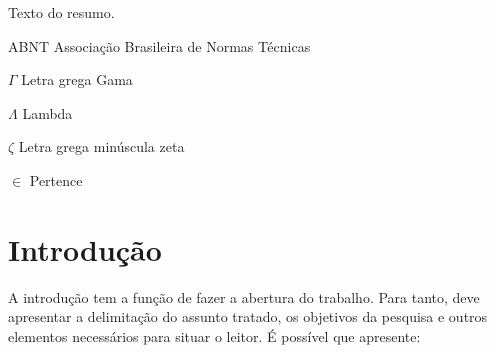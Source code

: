 \documentclass[12pt,oneside,a4paper,chapter=TITLE,section=TITLE,sumario
=tradicional]{abntex2}
\begin{document}

\imprimircapa
\imprimirfolhaderosto

\begin{resumo}
    Texto do resumo.
    
\end{resumo}

\listadefiguras
\listadegraficos
\listadetabelas
\listadequadros
\listadecodigos
\listadealgoritmos

\begin{siglas}
  \item[ABNT] Associação Brasileira de Normas Técnicas
\end{siglas}

\begin{simbolos}
  \item[$ \Gamma $] Letra grega Gama
  \item[$ \Lambda $] Lambda
  \item[$ \zeta $] Letra grega minúscula zeta
  \item[$ \in $] Pertence
\end{simbolos}

\sumario

\textual

\chapter{Introdução}
\label{cap:introducao}


A introdução tem a função de fazer a abertura do trabalho. Para tanto, deve 
apresentar a delimitação do assunto tratado, os objetivos da pesquisa e outros 
elementos necessários para situar o leitor. É possível que apresente:
\end{document}
